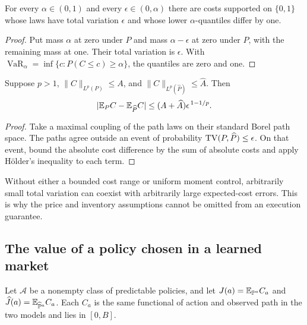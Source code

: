 \begin{proposition}\label{prop:var}
For every $\alpha\in(0,1)$ and every $\epsilon\in(0,\alpha)$ there are costs supported on $\{0,1\}$ whose laws have total variation $\epsilon$ and whose lower $\alpha$-quantiles differ by one.
\end{proposition}
\begin{proof}
Put mass $\alpha$ at zero under $P$ and mass $\alpha-\epsilon$ at zero under $\widehat P$, with the remaining mass at one. Their total variation is $\epsilon$. With
$\operatorname{VaR}_\alpha=\inf\{c:P(C\le c)\ge\alpha\}$,
the quantiles are zero and one.
\end{proof}

\begin{proposition}\label{prop:unbounded}
Suppose $p>1$, $\|C\|_{L^p(P)}\le A$, and
$\|C\|_{L^p(\widehat P)}\le\widehat A$. Then
\begin{equation}
 |\mathbb E_PC-\mathbb E_{\widehat P}C|
 \le(A+\widehat A)\epsilon^{\,1-1/p}.
\end{equation}
\end{proposition}
\begin{proof}
Take a maximal coupling of the path laws on their standard Borel path space. The paths agree outside an event of probability $\operatorname{TV}(P,\widehat P)\le\epsilon$. On that event, bound the absolute cost difference by the sum of absolute costs and apply H\"older's inequality to each term.
\end{proof}

Without either a bounded cost range or uniform moment control, arbitrarily small total variation can coexist with arbitrarily large expected-cost errors. This is why the price and inventory assumptions cannot be omitted from an execution guarantee.

\subsection{The value of a policy chosen in a learned market}
Let $\mathcal A$ be a nonempty class of predictable policies, and let
$J(a)=\mathbb E_{\mathbb P^a}C_a$ and
$\widehat J(a)=\mathbb E_{\widehat{\mathbb P}^a}C_a$.
Each $C_a$ is the same functional of action and observed path in the two models and lies in $[0,B]$.

